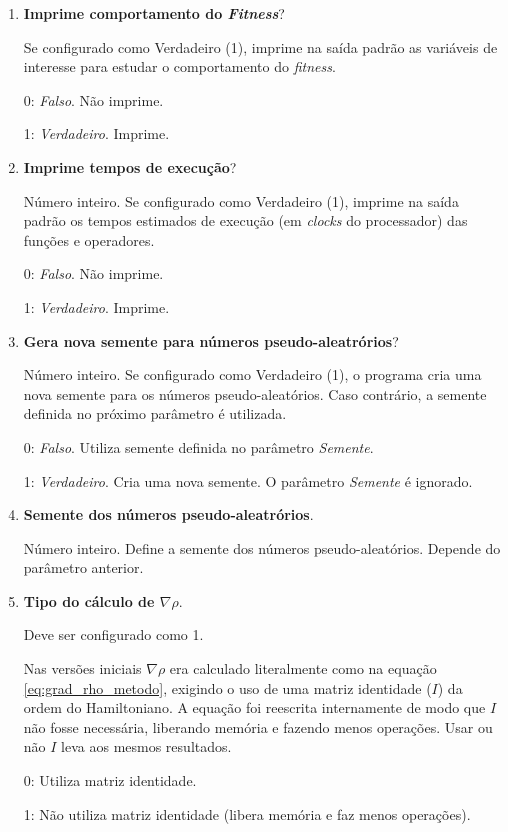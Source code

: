 \begin{enumerate}
\begin{itemize}
		\end{itemize}
		
		\item \textbf{Imprime comportamento do \emph{Fitness}}?
		
		Se configurado como Verdadeiro (1), imprime na saída padrão as variáveis de interesse para estudar o comportamento do \emph{fitness}. 
		
			0: \emph{Falso}. Não imprime.
			
			1: \emph{Verdadeiro}. Imprime.
		
		\item \textbf{Imprime tempos de execução}?
		
			Número inteiro. Se configurado como Verdadeiro (1), imprime na saída padrão os tempos estimados de execução (em \emph{clocks} do processador) das funções e operadores.
			
			
			0: \emph{Falso}. Não imprime.
			
			1: \emph{Verdadeiro}. Imprime.
			
		
		\item \textbf{Gera nova semente para números pseudo-aleatrórios}?
		
		Número inteiro. Se configurado como Verdadeiro (1), o programa cria uma nova semente para os números pseudo-aleatórios. Caso contrário, a semente definida no próximo parâmetro é utilizada.
		
		0: \emph{Falso}. Utiliza semente definida no parâmetro \emph{Semente}.
		
		1: \emph{Verdadeiro}. Cria uma nova semente. O parâmetro \emph{Semente} é ignorado.
		
		\item \textbf{Semente dos números pseudo-aleatrórios}.
		
		Número inteiro. Define a semente dos números pseudo-aleatórios. Depende do parâmetro anterior.
		
		\item \textbf{Tipo do cálculo de $\nabla \rho$}.
		
		Deve ser configurado como 1.
		
		Nas versões iniciais $\nabla \rho$ era calculado literalmente como na equação \ref{eq:grad_rho_metodo}, exigindo o uso de uma matriz identidade ($I$) da ordem do Hamiltoniano. A equação foi reescrita internamente de modo que $I$ não fosse necessária, liberando memória e fazendo menos operações. Usar ou não $I$ leva aos mesmos resultados.
		
		0: Utiliza matriz identidade.
		
		1: Não utiliza matriz identidade (libera memória e faz menos operações).
		
	\end{enumerate}